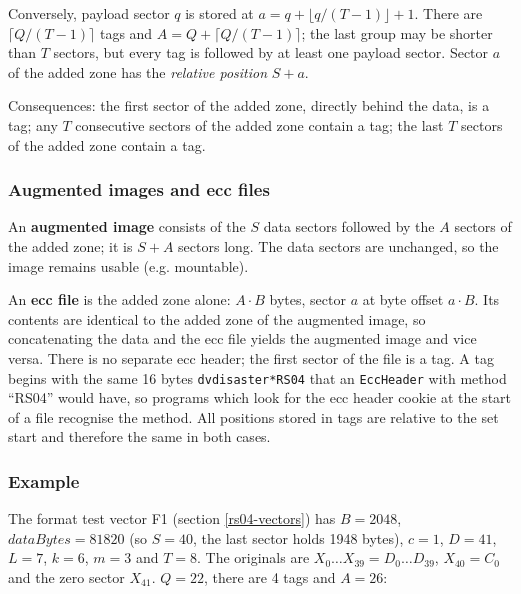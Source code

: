 Conversely, payload sector $q$ is stored at
$a = q + \lfloor q/(T-1) \rfloor + 1$. There are $\lceil Q/(T-1) \rceil$
tags and $A = Q + \lceil Q/(T-1) \rceil$; the last group may be shorter
than $T$ sectors, but every tag is followed by at least one payload sector.
Sector $a$ of the added zone has the {\em relative position} $S + a$.

\medskip

Consequences: the first sector of the added zone, directly behind the data,
is a tag; any $T$ consecutive sectors of the added zone contain a tag; the
last $T$ sectors of the added zone contain a tag.

\subsubsection{Augmented images and ecc files}

An {\bf augmented image} consists of the $S$ data sectors followed by the
$A$ sectors of the added zone; it is $S + A$ sectors long. The data sectors
are unchanged, so the image remains usable (e.g. mountable).

\medskip

An {\bf ecc file} is the added zone alone: $A \cdot B$ bytes, sector $a$ at
byte offset $a \cdot B$. Its contents are identical to the added zone of the
augmented image, so concatenating the data and the ecc file yields the
augmented image and vice versa. There is no separate ecc header; the first
sector of the file is a tag. A tag begins with the same 16 bytes
{\tt *dvdisaster*RS04} that an {\tt EccHeader} with method ``RS04'' would
have, so programs which look for the ecc header cookie at the start of a
file recognise the method. All positions stored in tags are relative to the
set start and therefore the same in both cases.

\subsubsection{Example}

The format test vector F1 (section \ref{rs04-vectors}) has $B = 2048$,
$dataBytes = 81820$ (so $S = 40$, the last sector holds 1948 bytes), $c = 1$,
$D = 41$, $L = 7$, $k = 6$, $m = 3$ and $T = 8$. The originals are
$X_0 \ldots X_{39} = D_0 \ldots D_{39}$, $X_{40} = C_0$ and the zero sector
$X_{41}$. $Q = 22$, there are 4 tags and $A = 26$:


